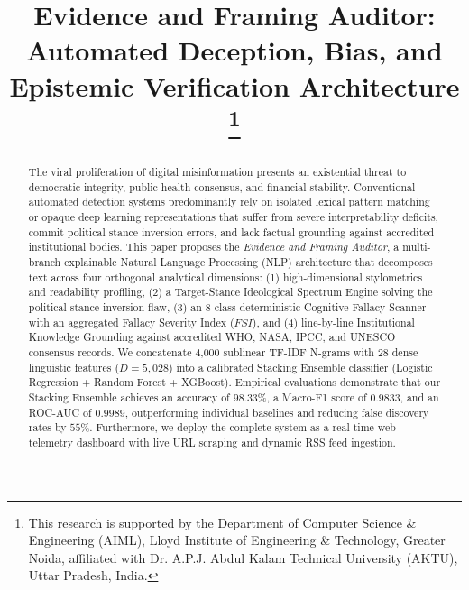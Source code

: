 \documentclass[conference]{IEEEtran}
\begin{document}
\title{Evidence and Framing Auditor: Automated Deception, Bias, and Epistemic Verification Architecture\\
\thanks{This research is supported by the Department of Computer Science \& Engineering (AIML), Lloyd Institute of Engineering \& Technology, Greater Noida, affiliated with Dr. A.P.J. Abdul Kalam Technical University (AKTU), Uttar Pradesh, India.}
}

\author{
}

\maketitle

\begin{abstract}
The viral proliferation of digital misinformation presents an existential threat to democratic integrity, public health consensus, and financial stability. Conventional automated detection systems predominantly rely on isolated lexical pattern matching or opaque deep learning representations that suffer from severe interpretability deficits, commit political stance inversion errors, and lack factual grounding against accredited institutional bodies. This paper proposes the \textit{Evidence and Framing Auditor}, a multi-branch explainable Natural Language Processing (NLP) architecture that decomposes text across four orthogonal analytical dimensions: (1) high-dimensional stylometrics and readability profiling, (2) a Target-Stance Ideological Spectrum Engine solving the political stance inversion flaw, (3) an 8-class deterministic Cognitive Fallacy Scanner with an aggregated Fallacy Severity Index ($FSI$), and (4) line-by-line Institutional Knowledge Grounding against accredited WHO, NASA, IPCC, and UNESCO consensus records. We concatenate 4,000 sublinear TF-IDF N-grams with 28 dense linguistic features ($D=5,028$) into a calibrated Stacking Ensemble classifier (Logistic Regression + Random Forest + XGBoost). Empirical evaluations demonstrate that our Stacking Ensemble achieves an accuracy of $98.33\%$, a Macro-F1 score of $0.9833$, and an ROC-AUC of $0.9989$, outperforming individual baselines and reducing false discovery rates by $55\%$. Furthermore, we deploy the complete system as a real-time web telemetry dashboard with live URL scraping and dynamic RSS feed ingestion.
\end{abstract}
\end{document}
